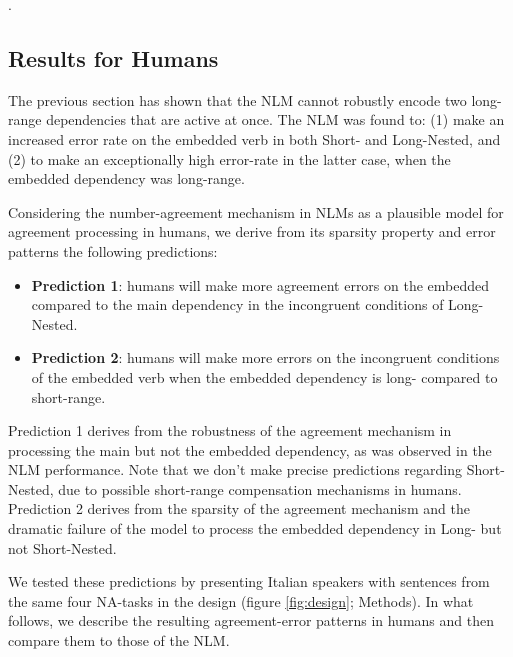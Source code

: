 .

\subsection{Results for Humans}
The previous section has shown that the NLM cannot robustly encode two long-range dependencies that are active at once. The NLM was found to: (1) make an increased error rate on the embedded verb in both Short- and Long-Nested, and (2) to make an exceptionally high error-rate in the latter case, when the embedded dependency was long-range.

Considering the number-agreement mechanism in NLMs as a plausible model for agreement processing in humans, we derive from its sparsity property and error patterns the following predictions:

\begin{itemize}
    \item \textbf{Prediction 1}: humans will make more agreement errors on the embedded compared to the main dependency in the incongruent conditions of Long-Nested. 
    \item \textbf{Prediction 2}: humans will make more errors on the incongruent conditions of the embedded verb when the embedded dependency is long- compared to short-range.
\end{itemize}

Prediction 1 derives from the robustness of the agreement mechanism in processing the main but not the embedded dependency, as was observed in the NLM performance. Note that we don't make precise predictions regarding Short-Nested, due to possible short-range compensation mechanisms in humans. Prediction 2 derives from the sparsity of the agreement mechanism and the dramatic failure of the model to process the embedded dependency in Long- but not Short-Nested. 

We tested these predictions by presenting Italian speakers with sentences from the same four NA-tasks in the design (figure \ref{fig:design}; Methods). In what follows, we describe the resulting agreement-error patterns in humans and then compare them to those of the NLM.

